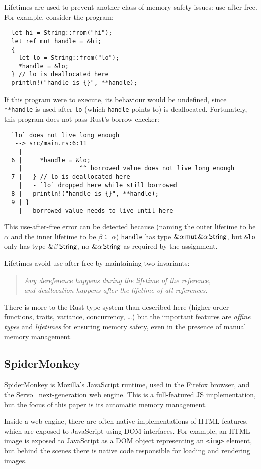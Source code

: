Lifetimes are used to prevent another class of memory safety issues: use-after-free.
For example, consider the program:
\begin{verbatim}
  let hi = String::from("hi");
  let ref mut handle = &hi;
  {
    let lo = String::from("lo");
    *handle = &lo;
  } // lo is deallocated here
  println!("handle is {}", **handle);
\end{verbatim}
If this program were to execute, its behaviour would be undefined,
since \verb|**handle| is used after \verb|lo|
(which \verb|handle| points to) is deallocated. Fortunately, this program
does not pass Rust's borrow-checker:
\begin{verbatim}
  `lo` does not live long enough
   --> src/main.rs:6:11
    |
  6 |     *handle = &lo;
    |                ^^ borrowed value does not live long enough
  7 |   } // lo is deallocated here
    |   - `lo` dropped here while still borrowed
  8 |   println!("handle is {}", **handle);
  9 | }
    | - borrowed value needs to live until here
\end{verbatim}
This use-after-free error can be detected because (naming the outer lifetime to be
$\alpha$ and the inner lifetime to be $\beta\subseteq\alpha$) \verb|handle| has type
$\&\alpha\,\mathsf{mut}\,\&\alpha\,\mathsf{String}$, but \verb|&lo| only has type $\&\beta\,\mathsf{String}$, no
$\&\alpha\,\mathsf{String}$ as required by the assignment.

Lifetimes avoid use-after-free by maintaining two invariants:
\begin{quote}\em
  Any dereference happens during the lifetime of the reference, \\
  and deallocation happens after the lifetime of all references.
\end{quote}
There is more to the Rust type system than described here
(higher-order functions, traits, variance, concurrency, \dots) but the important features
are \emph{affine types} and \emph{lifetimes} for ensuring memory safety,
even in the presence of manual memory management.

\subsection{SpiderMonkey}

SpiderMonkey is Mozilla's JavaScript runtime, used in the Firefox browser,
and the Servo~\cite{servo} next-generation web engine. This is a full-featured
JS implementation, but the focus of this paper is its automatic memory management.

Inside a web engine, there are often native implementations of HTML features,
which are exposed to JavaScript using DOM interfaces. For example, an HTML image
is exposed to JavaScript as a DOM object representing an \verb|<img>| element,
but behind the scenes there is native code responsible for loading and rendering
images.

